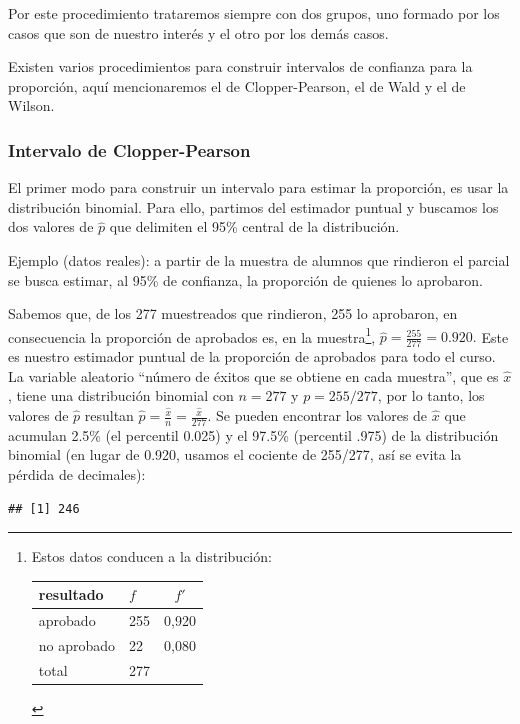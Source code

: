 \documentclass[]{book}
\let\rmarkdownfootnote\footnote%
\def\footnote{\protect\rmarkdownfootnote}
\begin{document}
Por este procedimiento trataremos siempre con dos grupos, uno formado
por los casos que son de nuestro interés y el otro por los demás casos.

Existen varios procedimientos para construir intervalos de confianza
para la proporción, aquí mencionaremos el de Clopper-Pearson, el de Wald
y el de Wilson.

\hypertarget{intervalo-de-clopper-pearson}{%
\subsubsection{Intervalo de Clopper-Pearson}\label{intervalo-de-clopper-pearson}}

El primer modo para construir un intervalo para estimar la proporción,
es usar la distribución binomial. Para ello, partimos del estimador
puntual y buscamos los dos valores de \(\widehat{p}\) que delimiten el 95\%
central de la distribución.

Ejemplo (datos reales): a partir de la muestra de alumnos que rindieron
el parcial se busca estimar, al 95\% de confianza, la proporción de
quienes lo aprobaron.

Sabemos que, de los 277 muestreados que rindieron, 255 lo aprobaron, en
consecuencia la proporción de aprobados es, en la muestra\footnote{Estos datos conducen a la distribución:

  \begin{longtable}[]{@{}llc@{}}
  \toprule
  resultado & \(f\) & \(f'\)\tabularnewline
  \midrule
  \endhead
  aprobado & 255 & 0,920\tabularnewline
  no aprobado & 22 & 0,080\tabularnewline
  total & 277 &\tabularnewline
  \bottomrule
  \end{longtable}},
\(\widehat{p} = \frac{255}{277} = 0.920.\) Este es nuestro estimador
puntual de la proporción de aprobados para todo el curso. La variable aleatorio ``número de éxitos que se obtiene en cada muestra'', que es \(\widehat{x}\), tiene una distribución binomial con \(n=277\) y \(p=255/277\), por lo tanto, los valores de \(\widehat{p}\) resultan \(\widehat{p}=\frac{\widehat{x}}{n}=\frac{\widehat{x}}{277}\). Se pueden encontrar los valores de \(\widehat{x}\) que acumulan 2.5\% (el percentil 0.025) y el 97.5\% (percentil .975) de la distribución binomial (en lugar de 0.920, usamos el cociente de 255/277, así se evita la pérdida de decimales):

\begin{verbatim}
## [1] 246
\end{verbatim}
\end{document}
